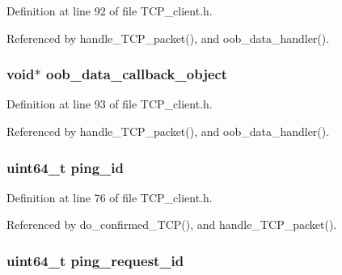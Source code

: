 Definition at line 92 of file T\+C\+P\+\_\+client.\+h.



Referenced by handle\+\_\+\+T\+C\+P\+\_\+packet(), and oob\+\_\+data\+\_\+handler().

\hypertarget{struct_t_c_p___client___connection_a3bd56ba2917797a0eea802a7192ef031}{
\subsubsection[{oob\+\_\+data\+\_\+callback\+\_\+object}]{\setlength{\rightskip}{0pt plus 5cm}void$\ast$ oob\+\_\+data\+\_\+callback\+\_\+object}}\label{struct_t_c_p___client___connection_a3bd56ba2917797a0eea802a7192ef031}


Definition at line 93 of file T\+C\+P\+\_\+client.\+h.



Referenced by handle\+\_\+\+T\+C\+P\+\_\+packet(), and oob\+\_\+data\+\_\+handler().

\hypertarget{struct_t_c_p___client___connection_acec02fbdff648ca71a6d8e5a0d63d634}{
\subsubsection[{ping\+\_\+id}]{\setlength{\rightskip}{0pt plus 5cm}uint64\+\_\+t ping\+\_\+id}}\label{struct_t_c_p___client___connection_acec02fbdff648ca71a6d8e5a0d63d634}


Definition at line 76 of file T\+C\+P\+\_\+client.\+h.



Referenced by do\+\_\+confirmed\+\_\+\+T\+C\+P(), and handle\+\_\+\+T\+C\+P\+\_\+packet().

\hypertarget{struct_t_c_p___client___connection_a8695cc319f7cab1ea66cb80e403d455b}{
\subsubsection[{ping\+\_\+request\+\_\+id}]{\setlength{\rightskip}{0pt plus 5cm}uint64\+\_\+t ping\+\_\+request\+\_\+id}}\label{struct_t_c_p___client___connection_a8695cc319f7cab1ea66cb80e403d455b}



